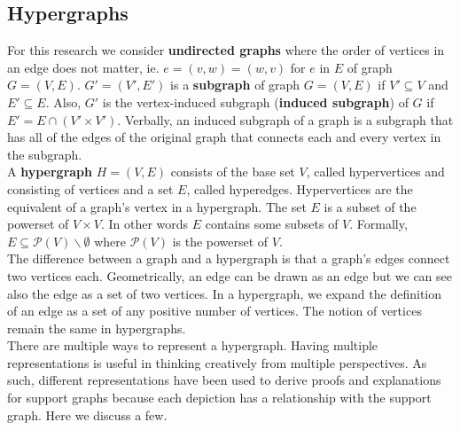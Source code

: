 \documentclass{NSF}
\begin{document}
\subsection{Hypergraphs}



For this research we consider \textbf{undirected graphs} where the order of vertices in an edge does not matter, ie. $e = (v,w) = (w,v)$ for $e$ in $E$ of graph $G = (V, E)$. $G' = (V', E')$ is a \textbf{subgraph} of graph $G = (V, E)$ if $V' \subseteq V$ and $E' \subseteq E$. Also, $G'$ is the vertex-induced subgraph (\textbf{induced subgraph}) of $G$ if $E' = E \cap (V' \times V') $. Verbally, an induced subgraph of a graph is a subgraph that has all of the edges of the original graph that connects each and every vertex in the subgraph.   \\



A \textbf{hypergraph} $H = (V, E)$ consists of the base set $V$, called hypervertices and consisting of vertices and a set $E$, called hyperedges. Hypervertices are the equivalent of a graph's vertex in a hypergraph. The set $E$ is a subset of the powerset of $V \times V$. In other words $E$ contains some subsets of $V$. Formally, $E \subseteq \mathcal{P}(V)\backslash\emptyset$ where $\mathcal{P}(V)$ is the powerset of $V$. \\

The difference between a graph and a hypergraph is that a graph's edges connect two vertices each. Geometrically, an edge can be drawn as an edge but we can see also the edge as a set of two vertices. In a hypergraph, we expand the definition of an edge as a set of any positive number of vertices. The notion of vertices remain the same in hypergraphs.\\

There are multiple ways to represent a hypergraph. Having multiple representations is useful in thinking creatively from multiple perspectives. As such, different representations have been used to derive proofs and explanations for support graphs because each depiction has a relationship with the support graph. Here we discuss a few.
\end{document}
